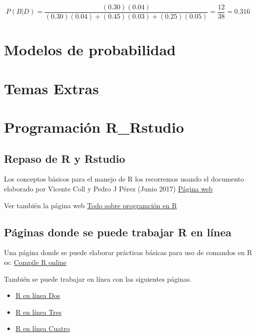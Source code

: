 \documentclass[
]{book}
\theoremstyle{definition}
\theoremstyle{definition}
\theoremstyle{definition}
\theoremstyle{definition}
\theoremstyle{remark}
\begin{document}
\[
    P(B|D)=\dfrac{(0.30)(0.04)}{(0.30)(0.04)+(0.45)(0.03)+(0.25)(0.05)}=\dfrac{12}{38}=0.316
\]

\hypertarget{modelos-de-probabilidad}{%
\chapter{Modelos de probabilidad}\label{modelos-de-probabilidad}}

\hypertarget{temas-extras}{%
\chapter{Temas Extras}\label{temas-extras}}

\hypertarget{programaciuxf3n-r_rstudio}{%
\chapter{Programación R\_Rstudio}\label{programaciuxf3n-r_rstudio}}

\hypertarget{repaso-de-r-y-rstudio}{%
\section{Repaso de R y Rstudio}\label{repaso-de-r-y-rstudio}}

Los conceptos básicos para el manejo de R los recorremos usando el documento elaborado por Vicente Coll y Pedro J Pérez (Junio 2017) \href{https://www.uv.es/pjperez/curso_R/tt_2_conceptos_basicos_R.html}{Página web}

Ver también la página web \href{https://r-coder.com/inicio/}{Todo sobre programción en R}

\hypertarget{puxe1ginas-donde-se-puede-trabajar-r-en-luxednea}{%
\section{Páginas donde se puede trabajar R en línea}\label{puxe1ginas-donde-se-puede-trabajar-r-en-luxednea}}

Una página donde se puede elaborar prácticas básicas para uso de comandos en R es: \href{https://www.tutorialspoint.com/execute_r_online.php}{Compile R online}

También se puede trabajar en línea con las siguientes páginas.

\begin{itemize}
\item
  \href{https://rdrr.io/snippets/}{R en línea Dos}
\item
  \href{https://paiza.io/es/projects/new}{R en línea Tres}
\item
  \href{https://www.mycompiler.io/new/r}{R en línea Cuatro}
\end{itemize}
\end{document}
